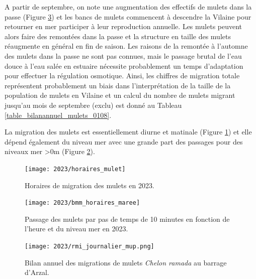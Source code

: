 \documentclass[11pt,twocolumn,titlepage,twoside]{article}\usepackage[]{graphicx}\usepackage[]{color}
\begin{document}
A partir de septembre, on note une augmentation des effectifs de mulets dans la
passe (Figure \ref{rmi_journalier_mup}) et les bancs de mulets commencent à
descendre la Vilaine pour retourner en mer participer à leur reproduction
annuelle. Les mulets peuvent alors faire des remontées dans la passe et la
structure en taille des mulets réaugmente en général en fin de saison. Les
raisons de la remontée à l'automne des mulets dans la passe ne sont pas connues,
mais le passage brutal de l'eau douce à l'eau salée en estuaire nécessite
probablement un temps d'adaptation pour effectuer la régulation osmotique.
Ainsi, les chiffres de migration totale représentent probablement un biais dans
l'interprétation de la taille de la population de mulets en Vilaine et un calcul
du nombre de mulets migrant jusqu'au mois de septembre (exclu) est donné au
Tableau \ref{table_bilanannuel_mulets_0108}.



La migration des mulets
est essentiellement diurne et matinale (Figure \ref{horaires_mulet}) et elle
dépend également du niveau mer avec une grande part des passages pour des niveaux mer
>0m (Figure \ref{horaires_maree_mulet}).

\begin{figure}[htpb]
\centering
\texttt{[image: 2023/horaires\_mulet]} 
\caption{Horaires de migration des mulets en 2023.}
\label{horaires_mulet}
\end{figure}



\begin{figure}[htpb]
\centering
\texttt{[image: 2023/bmm\_horaires\_maree]} 
\caption{Passage des mulets par pas de temps de 10 minutes en fonction de
l'heure et du niveau mer en
2023.}
\label{horaires_maree_mulet}
\end{figure}


\clearpage
\onecolumn

\begin{landscape}
\begin{figure}[htpb]
\centering
\texttt{[image: 2023/rmi\_journalier\_mup.png]} 
\caption{Bilan annuel des migrations de mulets \textit{Chelon ramada} au barrage
d'Arzal.}
\label{rmi_journalier_mup}
\end{figure}
\end{landscape}
\end{document}
